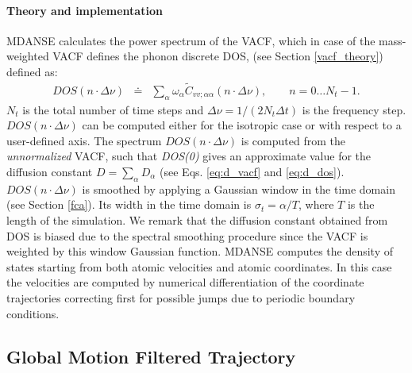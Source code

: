 \documentclass[a4paper,11pt]{article}
\begin{document}
\paragraph{Theory and implementation\\}
\label{dos_theory}
\gls{MDANSE} calculates the power spectrum of the \gls{VACF}, which in case of the mass-weighted \gls{VACF} defines the phonon 
discrete \gls{DOS}, (see Section \ref{vacf_theory}) defined as:
\begin{eqnarray}
DOS(n\cdot\Delta \nu)  &\doteq &\sum_{\alpha} \omega_\alpha 
\tilde C_{vv ; \alpha\alpha}(n\cdot\Delta \nu),\qquad n = 0\ldots N_t - 1.
\end{eqnarray}
$N_t$ is the total number of time steps and $\Delta\nu = 1/(2N_t \Delta t)$ is the frequency step. $DOS(n\cdot\Delta\nu)$ can 
be computed either for the isotropic case or with respect to a user-defined axis. The spectrum $DOS(n\cdot\Delta \nu)$ is computed from the 
\textit{unnormalized} \gls{VACF}, such that \textit{DOS(0)} gives an approximate value for the diffusion constant 
$D = \sum_\alpha D_\alpha$ (see Eqs. \ref{eq:d_vacf} and \ref{eq:d_dos}). $DOS(n\cdot\Delta \nu)$ is smoothed by 
applying a Gaussian window in the time domain \cite{Harris} (see Section \ref{fca}). Its width in the time domain is 
$\sigma_t=\alpha/T$, where $T$ is the length of 
the simulation. We remark that the diffusion constant obtained from \gls{DOS} is biased due to the spectral smoothing procedure since 
the \gls{VACF} is weighted by this window Gaussian function. \gls{MDANSE} computes the density of states starting from both atomic velocities 
and atomic coordinates. In this case the velocities are computed by numerical differentiation of the coordinate trajectories correcting 
first for possible jumps due to periodic boundary conditions.

\subsection{Global Motion Filtered Trajectory}
\label{gmft}
\end{document}
